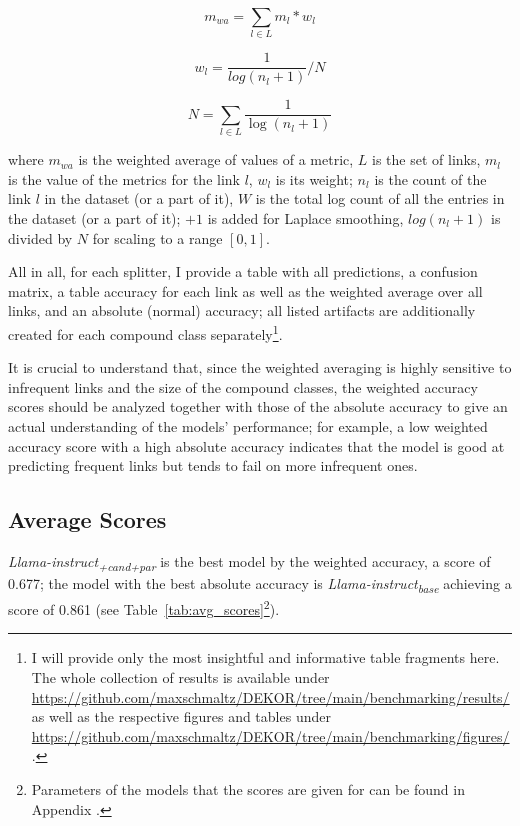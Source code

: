 \documentclass[11pt]{article}
\begin{document}
$$
m_{wa} = \sum_{l \in{L}}{m_l * w_l}
$$

$$
w_l = \frac{1}{log(n_l + 1)} / N
$$

$$
N = \sum_{l \in L} \frac{1}{\log(n_l + 1)}
$$

where $m_{wa}$ is the weighted average of values of a metric, $L$ is the set of links, $m_l$ is the value of the metrics for the link $l$, $w_l$ is its weight; $n_l$ is the count of the link $l$ in the dataset (or a part of it), $W$ is the total log count of all the entries in the dataset (or a part of it); $+1$ is added for Laplace smoothing, $log(n_l + 1)$ is divided by $N$ for scaling to a range $[0, 1]$.


All in all, for each splitter, I provide a table with all predictions, a confusion matrix, a table accuracy for each link as well as the weighted average over all links, and an absolute (normal) accuracy; all listed artifacts are additionally created for each compound class separately\footnote{I will provide only the most insightful and informative table fragments here. The whole collection of results is available under \url{https://github.com/maxschmaltz/DEKOR/tree/main/benchmarking/results/} as well as the respective figures and tables under \url{https://github.com/maxschmaltz/DEKOR/tree/main/benchmarking/figures/}.}.

It is crucial to understand that, since the weighted averaging is highly sensitive to infrequent links and the size of the compound classes, the weighted accuracy scores should be analyzed together with those of the absolute accuracy to give an actual understanding of the models' performance; for example, a low weighted accuracy score with a high absolute accuracy indicates that the model is good at predicting frequent links but tends to fail on more infrequent ones.


\subsection{Average Scores}

\textit{Llama-instruct\textsubscript{+cand+par}} is the best model by the weighted accuracy, a score of 0.677; the model with the best absolute accuracy is \textit{Llama-instruct\textsubscript{base}} achieving a score of 0.861 (see Table~\ref{tab:avg_scores}\footnote{Parameters of the models that the scores are given for can be found in Appendix .}). 
\end{document}
